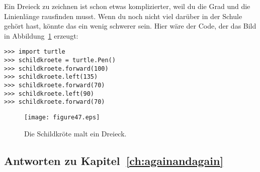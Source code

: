 \noindent
Ein Dreieck zu zeichnen ist schon etwas komplizierter, weil du die Grad und die Linienlänge rausfinden musst. Wenn du noch nicht viel darüber in der Schule gehört hast, könnte das ein wenig schwerer sein. Hier wäre der Code, der das Bild in Abbildung~\ref{fig47} erzeugt:

\begin{Verbatim}[frame=single]
>>> import turtle
>>> schildkroete = turtle.Pen()
>>> schildkroete.forward(100)
>>> schildkroete.left(135)
>>> schildkroete.forward(70)
>>> schildkroete.left(90)
>>> schildkroete.forward(70)
\end{Verbatim}

\begin{figure}
\begin{center}
\texttt{[image: figure47.eps]}
\end{center}
\caption{Die Schildkröte malt ein Dreieck.}\label{fig47}
\end{figure}

\subsection*{Antworten zu Kapitel~\ref{ch:againandagain}}

\noindent
